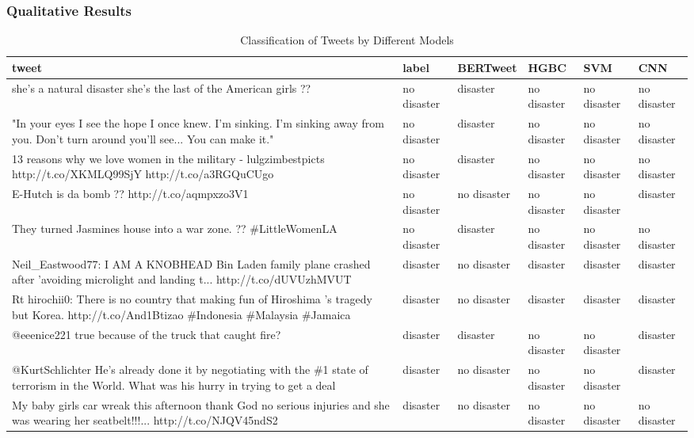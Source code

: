 \documentclass[10pt,table]{article}
\begin{document}
\subsubsection{Qualitative Results}
\begin{table}[h]
    \centering
    \begin{tabular}{|p{6cm}|l|l|l|l|l|}
    \hline
    \textbf{tweet} & \textbf{label} & \textbf{BERTweet} & \textbf{HGBC} & \textbf{SVM} & \textbf{CNN} \\ \hline
    she's a natural disaster she's the last of the American girls ?? & no disaster & disaster & no disaster & no disaster & no disaster \\ \hline
    "In your eyes I see the hope I once knew. I'm sinking. I'm sinking away from you. Don't turn around you'll see... You can make it." & no disaster & disaster & no disaster & no disaster & no disaster \\ \hline
    13 reasons why we love women in the military - lulgzimbestpicts http://t.co/XKMLQ99SjY http://t.co/a3RGQuCUgo & no disaster & disaster & no disaster & no disaster & no disaster \\ \hline
    E-Hutch is da bomb ?? http://t.co/aqmpxzo3V1 & no disaster & no disaster & no disaster & no disaster & disaster \\ \hline
    They turned Jasmines house into a war zone. ?? \#LittleWomenLA & no disaster & disaster & no disaster & no disaster & no disaster \\ \hline
    Neil_Eastwood77: I AM A KNOBHEAD\!\! Bin Laden family plane crashed after 'avoiding microlight and landing t... http://t.co/dUVUzhMVUT & disaster & no disaster & disaster & disaster & disaster \\ \hline
    Rt hirochii0: There is no country that making fun of Hiroshima 's tragedy but Korea. http://t.co/And1Btizao \#Indonesia \#Malaysia \#Jamaica & disaster & no disaster & disaster & disaster & disaster \\ \hline
    @eeenice221 true because of the truck that caught fire? & disaster & disaster & no disaster & no disaster & disaster \\ \hline
    @KurtSchlichter He's already done it by negotiating with the \#1 state of terrorism in the World. What was his hurry in trying to get a deal & disaster & no disaster & no disaster & no disaster & disaster \\ \hline
    My baby girls car wreak this afternoon thank God no serious injuries and she was wearing her seatbelt!!!... http://t.co/NJQV45ndS2 & disaster & no disaster & no disaster & no disaster & no disaster \\ \hline
    \end{tabular}
    \caption{Classification of Tweets by Different Models}
    \label{tab:tweets_classification}
\end{table}
\end{document}
